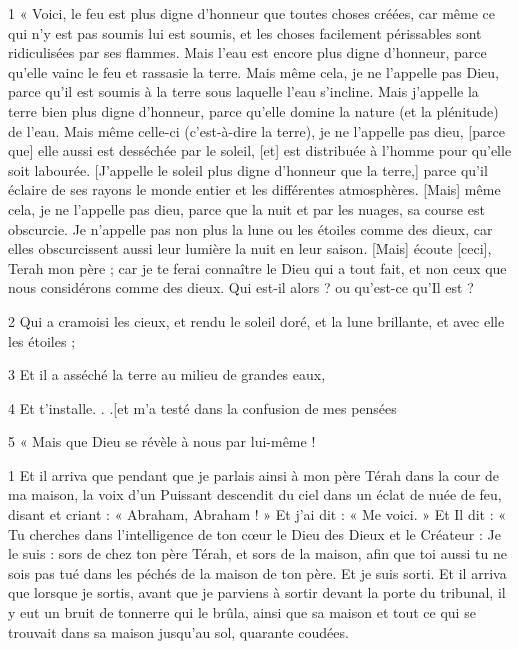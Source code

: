 \par 1 « Voici, le feu est plus digne d'honneur que toutes choses créées, car même ce qui n'y est pas soumis lui est soumis, et les choses facilement périssables sont ridiculisées par ses flammes. Mais l’eau est encore plus digne d’honneur, parce qu’elle vainc le feu et rassasie la terre. Mais même cela, je ne l'appelle pas Dieu, parce qu'il est soumis à la terre sous laquelle l'eau s'incline. Mais j’appelle la terre bien plus digne d’honneur, parce qu’elle domine la nature (et la plénitude) de l’eau. Mais même celle-ci (c'est-à-dire la terre), je ne l'appelle pas dieu, [parce que] elle aussi est desséchée par le soleil, [et] est distribuée à l'homme pour qu'elle soit labourée. [J'appelle le soleil plus digne d'honneur que la terre,] parce qu'il éclaire de ses rayons le monde entier et les différentes atmosphères. [Mais] même cela, je ne l'appelle pas dieu, parce que la nuit et par les nuages, sa course est obscurcie. Je n'appelle pas non plus la lune ou les étoiles comme des dieux, car elles obscurcissent aussi leur lumière la nuit en leur saison. [Mais] écoute [ceci], Terah mon père ; car je te ferai connaître le Dieu qui a tout fait, et non ceux que nous considérons comme des dieux. Qui est-il alors ? ou qu'est-ce qu'Il est ?

\par 2 Qui a cramoisi les cieux, et rendu le soleil doré, et la lune brillante, et avec elle les étoiles ;

\par 3 Et il a asséché la terre au milieu de grandes eaux,

\par 4 Et t'installe. . .[et m'a testé dans la confusion de mes pensées

\par 5 « Mais que Dieu se révèle à nous par lui-même !


\par 1 Et il arriva que pendant que je parlais ainsi à mon père Térah dans la cour de ma maison, la voix d'un Puissant descendit du ciel dans un éclat de nuée de feu, disant et criant : « Abraham, Abraham ! » Et j’ai dit : « Me voici. » Et Il dit : « Tu cherches dans l’intelligence de ton cœur le Dieu des Dieux et le Créateur : Je le suis : sors de chez ton père Térah, et sors de la maison, afin que toi aussi tu ne sois pas tué dans les péchés de la maison de ton père. Et je suis sorti. Et il arriva que lorsque je sortis, avant que je parviens à sortir devant la porte du tribunal, il y eut un bruit de tonnerre qui le brûla, ainsi que sa maison et tout ce qui se trouvait dans sa maison jusqu'au sol, quarante coudées.


